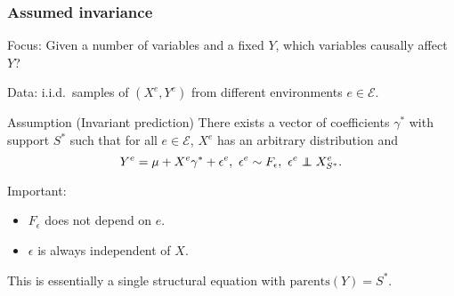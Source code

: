\documentclass{beamer}
\newcommand\independent{\protect\mathpalette{\protect\independenT}{\perp}}
\def\independenT#1#2{\mathrel{\rlap{$#1#2$}\mkern2mu{#1#2}}}
\begin{document}
\begin{frame}
  \frametitle{Assumed invariance}
  Focus: Given a number of variables and a fixed $Y$, which variables
  causally affect $Y$?

  Data: i.i.d.\ samples of $(X^e,Y^e)$ from different environments $e
  \in \mathcal{E}$.

  \begin{block}{Assumption (Invariant prediction)}
    There exists a vector of coefficients $\gamma^{*}$ with support
    $S^{*}$ such that for all $e \in \mathcal{E}$, $X^e$ has an arbitrary
    distribution and
    \[
    Y^e = \mu + X^e \gamma^{*} + \epsilon^e,~\epsilon^e \sim
    F_{\epsilon},~\epsilon^e \independent X^e_{S^{*}}.
    \]
  \end{block}
  Important:
  \begin{itemize}
  \item $F_{\epsilon}$ does not depend on $e$.
  \item $\epsilon$ is always independent of $X$.
  \end{itemize}

  This is essentially a single structural equation with
  $\mathrm{parents}(Y) = S^{*}$.
\end{frame}
\end{document}
